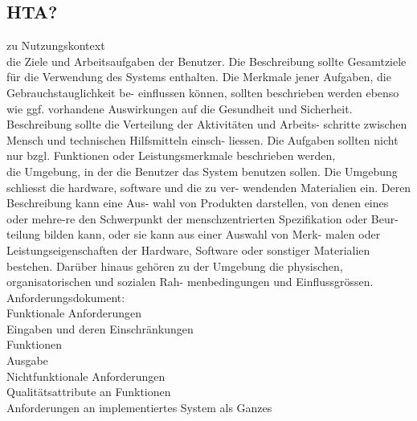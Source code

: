 \subsection{HTA?}

zu Nutzungskontext\\
die Ziele und Arbeitsaufgaben der Benutzer. Die Beschreibung sollte Gesamtziele für die Verwendung des Systems enthalten. Die Merkmale jener Aufgaben, die Gebrauchstauglichkeit be- einflussen können, sollten beschrieben werden ebenso wie ggf. vorhandene Auswirkungen auf die Gesundheit und Sicherheit. Beschreibung sollte die Verteilung der Aktivitäten und Arbeits- schritte zwischen Mensch und technischen Hilfsmitteln einsch- liessen. Die Aufgaben sollten nicht nur bzgl. Funktionen oder Leistungsmerkmale beschrieben werden,\\

die Umgebung, in der die Benutzer das System benutzen sollen. Die Umgebung schliesst die hardware, software und die zu ver- wendenden Materialien ein. Deren Beschreibung kann eine Aus- wahl von Produkten darstellen, von denen eines oder mehre-re den Schwerpunkt der menschzentrierten Spezifikation oder Beur- teilung bilden kann, oder sie kann aus einer Auswahl von Merk- malen oder Leistungseigenschaften der Hardware, Software oder sonstiger Materialien bestehen. Darüber hinaus gehören zu der Umgebung die physischen, organisatorischen und sozialen Rah- menbedingungen und Einflussgrössen.\\


Anforderungsdokument:\\
Funktionale Anforderungen\\
Eingaben und deren Einschränkungen\\
Funktionen\\
Ausgabe\\

Nichtfunktionale Anforderungen\\
Qualitätsattribute an Funktionen\\
Anforderungen an implementiertes System als Ganzes\\





